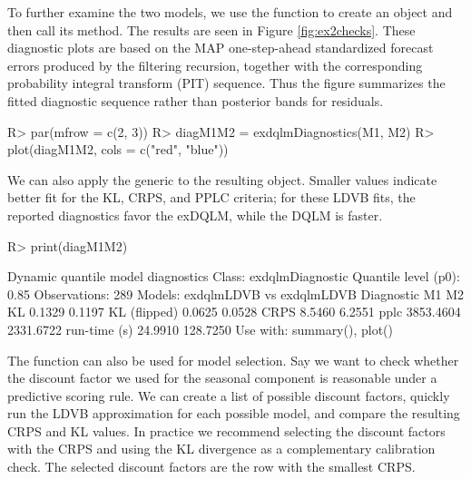 \documentclass{jss}
\begin{document}
To further examine the two models, we use the function  to create an  object and then call its  method. The results are seen in Figure \ref{fig:ex2checks}. These diagnostic plots are based on the MAP one-step-ahead standardized forecast errors produced by the filtering recursion, together with the corresponding probability integral transform (PIT) sequence. Thus the figure summarizes the fitted diagnostic sequence rather than posterior bands for residuals.

\begin{CodeChunk}
\begin{CodeInput}
R> par(mfrow = c(2, 3))
R> diagM1M2 = exdqlmDiagnostics(M1, M2)
R> plot(diagM1M2, cols = c("red", "blue"))
\end{CodeInput}
\end{CodeChunk}

We can also apply the  generic to the resulting  object. Smaller values indicate better fit for the KL, CRPS, and PPLC criteria; for these LDVB fits, the reported diagnostics favor the exDQLM, while the DQLM is faster.

\begin{CodeChunk}
\begin{CodeInput}
R> print(diagM1M2)
\end{CodeInput}
\begin{CodeOutput}
Dynamic quantile model diagnostics
Class: exdqlmDiagnostic
Quantile level (p0): 0.85
Observations: 289
Models: exdqlmLDVB vs exdqlmLDVB
   Diagnostic        M1        M2
           KL    0.1329    0.1197
 KL (flipped)    0.0625    0.0528
         CRPS    8.5460    6.2551
         pplc 3853.4604 2331.6722
 run-time (s)   24.9910  128.7250
Use with: summary(), plot()
\end{CodeOutput}
\end{CodeChunk}

The function  can also be used for model selection. Say we want to check whether the discount factor we used for the seasonal component is reasonable under a predictive scoring rule. We can create a list of possible discount factors, quickly run the LDVB approximation for each possible model, and compare the resulting CRPS and KL values. In practice we recommend selecting the discount factors with the CRPS and using the KL divergence as a complementary calibration check. The selected discount factors are the row with the smallest CRPS.
\end{document}
